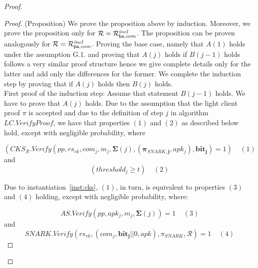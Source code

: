 \begin{proof}
\begin{proof}(Proposition) We prove the proposition above by induction. Moreover, we prove the proposition 
only for $ \mathcal{R} = \mathcal{R}^{\mathit{incl}}_{\mathsf{ba},\mathit{com}}$. The proposition can be proven analogously for $\mathcal{R} = \mathcal{R}^{\mathit{incl}}_{\mathsf{pa},\mathit{com}}$. 
Proving the base case, namely that $A(1)$ holds under the assumption G.1. and proving that $A(j)$ holds 
if $B(j-1)$ holds follows a very similar proof structure hence we give complete details only for the latter and add 
only the differences for the former. We complete the induction step by proving that if $A(j)$ holds then $B(j)$ holds. \\

\noindent First proof of the induction step: Assume that statement $B(j-1)$ holds. We have to prove that $A(j)$ holds. 
Due to the assumption that the light client proof $\pi$ is accepted and due to 
the definition of step $j$ in algorithm $\mathit{LC.VerifyProof}$, we have that properties 
$(1)$ and $(2)$ as described below hold, except with negligible probability, where

$$(\mathit{CKS}_{\mathcal{R}}.\mathit{Verify}(\mathit{pp},  \mathit{rs_{\mathit{vk}}}, \mathit{com_j}, m_j, 
 \mathbf{\Sigma}(j), (\mathbf{\pi_{\mathit{SNARK},j}}, \mathit{apk_j}), 
\mathbf{bit_j}) = 1) \ \ \ \ \  (1)$$ 
and
$$(\mathit{threshold_j} \geq t) \ \ \ \ \  (2)$$

\noindent Due to instantiation~\ref{inst:cks}, $(1)$, in turn, is equivalent to properties $(3)$ and $(4)$ holding, 
except with negligible probability, where:

$$ \mathit{AS.Verify}(\mathit{pp}, \mathit{apk_j}, m_j, \mathbf{\Sigma}(j)) = 1 \ \ \ \ \  (3)$$ 
and
$$\mathit{SNARK.Verify}(\mathit{rs}_{\mathit{vk}}, (\mathit{com_j}, \mathbf{bit_{j}} || 0, \mathit{apk}), \pi_{\mathit{SNARK}}, \mathcal{R}) = 1 \ \ \ \ \  (4)$$ 


\end{proof}
\end{proof}
